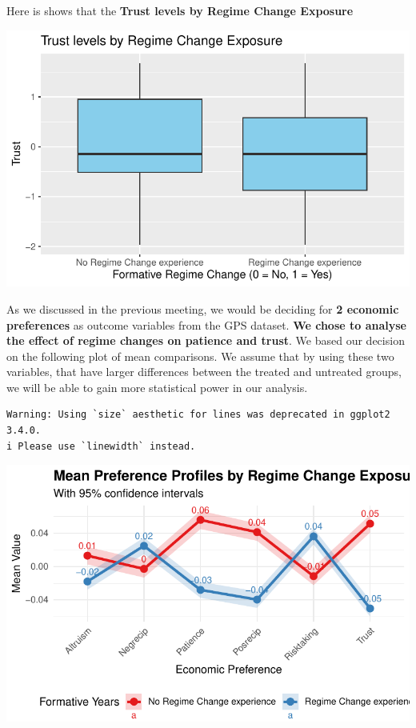 \documentclass[
  letterpaper,
  DIV=11,
  numbers=noendperiod]{scrartcl}
\begin{document}
Here is shows that the \textbf{Trust levels by Regime Change Exposure}

\includegraphics{Milestone-2-Data_files/figure-pdf/unnamed-chunk-7-1.pdf}

As we discussed in the previous meeting, we would be deciding for
\textbf{2 economic preferences} as outcome variables from the GPS
dataset. \textbf{We chose to analyse the effect of regime changes on
patience and trust}. We based our decision on the following plot of mean
comparisons. We assume that by using these two variables, that have
larger differences between the treated and untreated groups, we will be
able to gain more statistical power in our analysis.

\begin{verbatim}
Warning: Using `size` aesthetic for lines was deprecated in ggplot2 3.4.0.
i Please use `linewidth` instead.
\end{verbatim}

\includegraphics{Milestone-2-Data_files/figure-pdf/unnamed-chunk-8-1.pdf}
\end{document}
